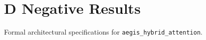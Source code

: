 \section{D Negative Results}

Formal architectural specifications for \texttt{aegis_hybrid_attention}.
